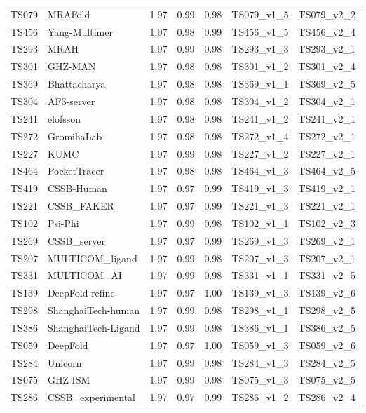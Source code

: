 \begin{longtable}{lllllll}
TS079 & MRAFold & 1.97 & 0.99 & 0.98 & TS079\_v1\_5 & TS079\_v2\_2 \\ 
TS456 & Yang-Multimer & 1.97 & 0.98 & 0.99 & TS456\_v1\_5 & TS456\_v2\_4 \\ 
TS293 & MRAH & 1.97 & 0.99 & 0.98 & TS293\_v1\_3 & TS293\_v2\_1 \\ 
TS301 & GHZ-MAN & 1.97 & 0.98 & 0.98 & TS301\_v1\_2 & TS301\_v2\_4 \\ 
TS369 & Bhattacharya & 1.97 & 0.98 & 0.98 & TS369\_v1\_1 & TS369\_v2\_5 \\ 
TS304 & AF3-server & 1.97 & 0.98 & 0.98 & TS304\_v1\_2 & TS304\_v2\_1 \\ 
TS241 & elofsson & 1.97 & 0.98 & 0.98 & TS241\_v1\_2 & TS241\_v2\_1 \\ 
TS272 & GromihaLab & 1.97 & 0.98 & 0.98 & TS272\_v1\_4 & TS272\_v2\_1 \\ 
TS227 & KUMC & 1.97 & 0.99 & 0.98 & TS227\_v1\_2 & TS227\_v2\_1 \\ 
TS464 & PocketTracer & 1.97 & 0.98 & 0.98 & TS464\_v1\_3 & TS464\_v2\_5 \\ 
TS419 & CSSB-Human & 1.97 & 0.97 & 0.99 & TS419\_v1\_3 & TS419\_v2\_1 \\ 
TS221 & CSSB\_FAKER & 1.97 & 0.97 & 0.99 & TS221\_v1\_3 & TS221\_v2\_1 \\ 
TS102 & Psi-Phi & 1.97 & 0.99 & 0.98 & TS102\_v1\_1 & TS102\_v2\_3 \\ 
TS269 & CSSB\_server & 1.97 & 0.97 & 0.99 & TS269\_v1\_3 & TS269\_v2\_1 \\ 
TS207 & MULTICOM\_ligand & 1.97 & 0.99 & 0.98 & TS207\_v1\_3 & TS207\_v2\_1 \\ 
TS331 & MULTICOM\_AI & 1.97 & 0.99 & 0.98 & TS331\_v1\_1 & TS331\_v2\_5 \\ 
TS139 & DeepFold-refine & 1.97 & 0.97 & 1.00 & TS139\_v1\_3 & TS139\_v2\_6 \\ 
TS298 & ShanghaiTech-human & 1.97 & 0.99 & 0.98 & TS298\_v1\_1 & TS298\_v2\_5 \\ 
TS386 & ShanghaiTech-Ligand & 1.97 & 0.99 & 0.98 & TS386\_v1\_1 & TS386\_v2\_5 \\ 
TS059 & DeepFold & 1.97 & 0.97 & 1.00 & TS059\_v1\_3 & TS059\_v2\_6 \\ 
TS284 & Unicorn & 1.97 & 0.99 & 0.98 & TS284\_v1\_3 & TS284\_v2\_5 \\ 
TS075 & GHZ-ISM & 1.97 & 0.99 & 0.98 & TS075\_v1\_3 & TS075\_v2\_5 \\ 
TS286 & CSSB\_experimental & 1.97 & 0.97 & 0.99 & TS286\_v1\_2 & TS286\_v2\_4 \\ 

\end{longtable}
